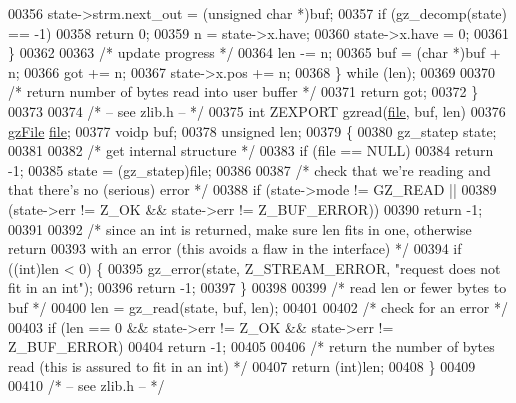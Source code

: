 \begin{DoxyCode}
00356             state->strm.next\_out = (\textcolor{keywordtype}{unsigned} \textcolor{keywordtype}{char} *)buf;
00357             \textcolor{keywordflow}{if} (gz\_decomp(state) == -1)
00358                 \textcolor{keywordflow}{return} 0;
00359             n = state->x.have;
00360             state->x.have = 0;
00361         \}
00362 
00363         \textcolor{comment}{/* update progress */}
00364         len -= n;
00365         buf = (\textcolor{keywordtype}{char} *)buf + n;
00366         got += n;
00367         state->x.pos += n;
00368     \} \textcolor{keywordflow}{while} (len);
00369 
00370     \textcolor{comment}{/* return number of bytes read into user buffer */}
00371     \textcolor{keywordflow}{return} got;
00372 \}
00373 
00374 \textcolor{comment}{/* -- see zlib.h -- */}
00375 \textcolor{keywordtype}{int} ZEXPORT gzread(\hyperlink{structfile}{file}, buf, len)
00376     \hyperlink{structgz_file__s}{gzFile} \hyperlink{structfile}{file};
00377     voidp buf;
00378     \textcolor{keywordtype}{unsigned} len;
00379 \{
00380     gz\_statep state;
00381 
00382     \textcolor{comment}{/* get internal structure */}
00383     \textcolor{keywordflow}{if} (file == NULL)
00384         \textcolor{keywordflow}{return} -1;
00385     state = (gz\_statep)file;
00386 
00387     \textcolor{comment}{/* check that we're reading and that there's no (serious) error */}
00388     \textcolor{keywordflow}{if} (state->mode != GZ\_READ ||
00389             (state->err != Z\_OK && state->err != Z\_BUF\_ERROR))
00390         \textcolor{keywordflow}{return} -1;
00391 
00392     \textcolor{comment}{/* since an int is returned, make sure len fits in one, otherwise return}
00393 \textcolor{comment}{       with an error (this avoids a flaw in the interface) */}
00394     \textcolor{keywordflow}{if} ((\textcolor{keywordtype}{int})len < 0) \{
00395         gz\_error(state, Z\_STREAM\_ERROR, \textcolor{stringliteral}{"request does not fit in an int"});
00396         \textcolor{keywordflow}{return} -1;
00397     \}
00398 
00399     \textcolor{comment}{/* read len or fewer bytes to buf */}
00400     len = gz\_read(state, buf, len);
00401 
00402     \textcolor{comment}{/* check for an error */}
00403     \textcolor{keywordflow}{if} (len == 0 && state->err != Z\_OK && state->err != Z\_BUF\_ERROR)
00404         \textcolor{keywordflow}{return} -1;
00405 
00406     \textcolor{comment}{/* return the number of bytes read (this is assured to fit in an int) */}
00407     \textcolor{keywordflow}{return} (\textcolor{keywordtype}{int})len;
00408 \}
00409 
00410 \textcolor{comment}{/* -- see zlib.h -- */}

\end{DoxyCode}
